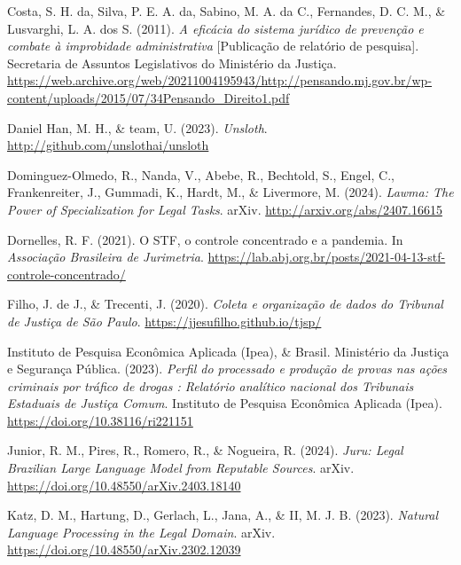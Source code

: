 \documentclass[
  12pt,
  letterpaper,
]{book}
\newlength{\cslhangindent}
\newenvironment{CSLReferences}[2] %
 {\begin{list}{}{%
  \setlength{\itemindent}{0pt}
  \setlength{\leftmargin}{0pt}
  \setlength{\parsep}{0pt}
  \ifodd #1
   \setlength{\leftmargin}{\cslhangindent}
   \setlength{\itemindent}{-1\cslhangindent}
  \fi
  \setlength{\itemsep}{#2\baselineskip}}}
 {\end{list}}
\begin{document}
\begin{CSLReferences}{1}{0}
Costa, S. H. da, Silva, P. E. A. da, Sabino, M. A. da C., Fernandes, D.
C. M., \& Lusvarghi, L. A. dos S. (2011). \emph{A eficácia do sistema
jurídico de prevenção e combate à improbidade administrativa}
{[}Publicação de relatório de pesquisa{]}. Secretaria de Assuntos
Legislativos do Ministério da Justiça.
\url{https://web.archive.org/web/20211004195943/http://pensando.mj.gov.br/wp-content/uploads/2015/07/34Pensando_Direito1.pdf}

Daniel Han, M. H., \& team, U. (2023). \emph{Unsloth}.
\url{http://github.com/unslothai/unsloth}

Dominguez-Olmedo, R., Nanda, V., Abebe, R., Bechtold, S., Engel, C.,
Frankenreiter, J., Gummadi, K., Hardt, M., \& Livermore, M. (2024).
\emph{Lawma: {The} {Power} of {Specialization} for {Legal} {Tasks}}.
arXiv. \url{http://arxiv.org/abs/2407.16615}

Dornelles, R. F. (2021). O {STF}, o controle concentrado e a pandemia.
In \emph{Associação Brasileira de Jurimetria}.
\url{https://lab.abj.org.br/posts/2021-04-13-stf-controle-concentrado/}

Filho, J. de J., \& Trecenti, J. (2020). \emph{Coleta e organização de
dados do {Tribunal} de {Justiça} de {São} {Paulo}}.
\url{https://jjesufilho.github.io/tjsp/}

Instituto de Pesquisa Econômica Aplicada (Ipea), \& Brasil. Ministério
da Justiça e Segurança Pública. (2023). \emph{Perfil do processado e
produção de provas nas ações criminais por tráfico de drogas : Relatório
analítico nacional dos {Tribunais} {Estaduais} de {Justiça} {Comum}}.
Instituto de Pesquisa Econômica Aplicada (Ipea).
\url{https://doi.org/10.38116/ri221151}

Junior, R. M., Pires, R., Romero, R., \& Nogueira, R. (2024).
\emph{Juru: {Legal} {Brazilian} {Large} {Language} {Model} from
{Reputable} {Sources}}. arXiv.
\url{https://doi.org/10.48550/arXiv.2403.18140}

Katz, D. M., Hartung, D., Gerlach, L., Jana, A., \& II, M. J. B. (2023).
\emph{Natural {Language} {Processing} in the {Legal} {Domain}}. arXiv.
\url{https://doi.org/10.48550/arXiv.2302.12039}


\end{CSLReferences}
\end{document}
